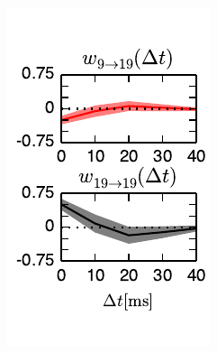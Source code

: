 \documentclass[aos,noinfoline]{imsart} %
\begin{document}
\begin{figure}[t!]
\begin{subfigure}[T]{1.4in}
	    \includegraphics[width=\textwidth]{figure1c}
  \end{subfigure}
  ~
  \begin{subfigure}[T]{2.2in}

\end{subfigure}
\end{figure}
\end{document}
